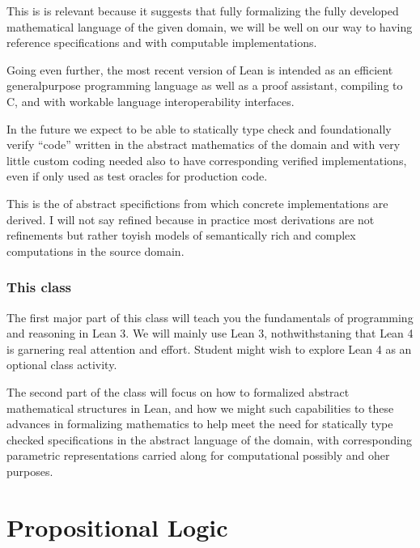 \documentclass[letterpaper,10pt,english]{sphinxmanual}
\begin{document}
\sphinxAtStartPar
This is is relevant because it suggests that fully formalizing
the fully developed mathematical language of the given domain,
we will be well on our way to having reference specifications
and with computable implementations.

\sphinxAtStartPar
Going even further, the most recent version of Lean is intended
as an efficient general\sphinxhyphen{}purpose programming language as well as
a proof assistant, compiling to C, and with workable language
interoperability interfaces.

\sphinxAtStartPar
In the future we expect to be able to statically type check and
foundationally verify “code” written in the abstract mathematics
of the domain and with very little custom coding needed also to
have corresponding verified implementations, even if only used as
test oracles for production code.

\sphinxAtStartPar
This is the of abstract specifictions from which concrete
implementations are derived. I will not say refined because
in practice most derivations are not refinements but rather
toyish models of semantically rich and complex computations
in the source domain.


\subsection{This class}
\label{\detokenize{A_00_Introduction:id1}}
\sphinxAtStartPar
The first major part of this class will teach you the fundamentals
of programming and reasoning in Lean 3. We will mainly use Lean 3,
nothwithstaning that Lean 4 is garnering real attention and effort.
Student might wish to explore Lean 4 as an optional class activity.

\sphinxAtStartPar
The second part of the class will focus on how to formalized abstract
mathematical structures in Lean, and how we might such capabilities
to  these advances in formalizing mathematics to help meet
the need for statically type checked specifications in the abstract
language of the domain, with corresponding parametric representations
carried along for computational possibly and oher purposes.

\sphinxstepscope


\chapter{Propositional Logic}
\label{\detokenize{A_01_Propositional_Logic:propositional-logic}}\label{\detokenize{A_01_Propositional_Logic:introduction}}\label{\detokenize{A_01_Propositional_Logic::doc}}
\end{document}
